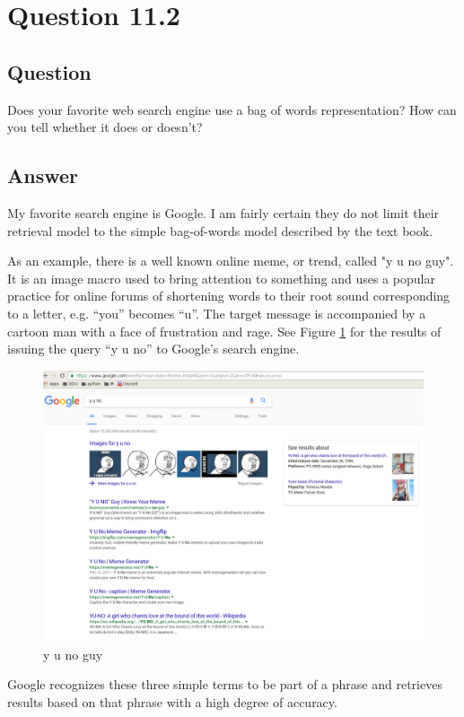 \section{Question 11.2}

\subsection{Question}
Does your favorite web search engine use a bag of words representation?  How can you tell whether it does or doesn't?

\subsection{Answer}
My favorite search engine is Google.  I am fairly certain they do not limit their retrieval model to the simple bag-of-words model described by the text book.

As an example, there is a well known online meme, or trend, called "y u no guy".  It is an image macro used to bring attention to something and uses a popular practice for online forums of shortening words to their root sound corresponding to a letter, e.g. ``you'' becomes ``u''.  The target message is accompanied by a cartoon man with a face of frustration and rage.  See Figure \ref{fig:yuno} for the results of issuing the query ``y u no'' to Google's search engine.

\begin{figure}[H]
\centering
\label{fig:yuno}
\includegraphics[scale=.25]{q11.2/yuno.png}
\caption{y u no guy}
\end{figure}

Google recognizes these three simple terms to be part of a phrase and retrieves results based on that phrase with a high degree of accuracy.


